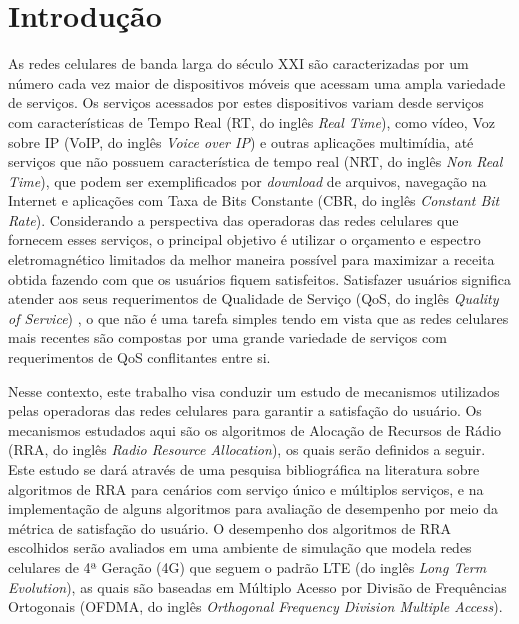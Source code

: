 \chapter[Introdução]{Introdução}
\label{introducao}

As redes celulares de banda larga do século XXI são caracterizadas por um número cada vez maior de dispositivos móveis que acessam uma ampla variedade de serviços.
Os serviços acessados por estes dispositivos variam desde serviços com características de Tempo Real (RT, do inglês \textit{Real Time}), como vídeo, Voz sobre IP (VoIP, do inglês \textit{Voice over IP}) e outras aplicações multimídia, até serviços que não possuem característica de tempo real (NRT, do inglês \textit{Non Real Time}), que podem ser exemplificados por \textit{download} de arquivos, navegação na Internet e aplicações com Taxa de Bits Constante (CBR, do inglês \textit{Constant Bit Rate}). Considerando a perspectiva das operadoras das redes celulares que fornecem esses serviços, o principal objetivo é utilizar o orçamento e espectro eletromagnético limitados da melhor maneira possível para maximizar a receita obtida fazendo com que os usuários fiquem satisfeitos. Satisfazer usuários significa atender aos seus requerimentos de Qualidade de Serviço (QoS, do inglês \textit{Quality of Service}) \cite{Rodrigues2014_Wiley}, o que não é uma tarefa simples tendo em vista que as redes celulares mais recentes são compostas por uma grande variedade de serviços com requerimentos de QoS conflitantes entre si.     

Nesse contexto, este trabalho visa conduzir um estudo de mecanismos utilizados pelas operadoras das redes celulares para garantir a satisfação do usuário. Os mecanismos estudados aqui são os algoritmos de Alocação de Recursos de Rádio (RRA, do inglês \textit{Radio Resource Allocation}), os quais serão definidos a seguir. Este estudo se dará através de uma pesquisa bibliográfica na literatura sobre algoritmos de RRA para cenários com serviço único e múltiplos serviços, e na implementação de alguns algoritmos para avaliação de desempenho por meio da métrica de satisfação do usuário. O desempenho dos algoritmos de RRA escolhidos serão avaliados em uma ambiente de simulação que modela redes celulares de 4ª Geração (4G) que seguem o padrão LTE (do inglês \textit{Long Term Evolution}), as quais são baseadas em Múltiplo Acesso por Divisão de Frequências Ortogonais (OFDMA, do inglês \textit{Orthogonal Frequency Division Multiple Access}). 

